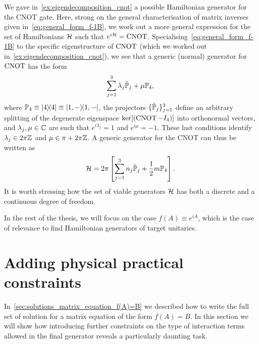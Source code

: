 \begin{example}[label={ex:cnot_generator_decomposition}]
We gave in~\cref{ex:eigendecomposition_cnot} a possible Hamiltonian generator for the CNOT gate.
Here, strong on the general characterisation of matrix inverses given in~\cref{eq:general_form_f-1B}, we work out a more general expression for the set of Hamiltonians ${\mathcal{H}}$ such that $e^{i{\mathcal{H}}}=\operatorname{CNOT}$.
Specialising~\cref{eq:general_form_f-1B} to the specific eigenstructure of $\operatorname{CNOT}$ (which we worked out in~\cref{ex:eigendecomposition_cnot}), we see that a generic (normal) generator for $\operatorname{CNOT}$ has the form
\begin{equation}
    \sum_{j=1}^3 \lambda_j \tilde{\mathbb{P}}_j + \mu\mathbb{P}_4,
\end{equation}
where
$\mathbb{P}_4\equiv\ketbra 4\equiv\ketbra{1,-}$, the projectors 
$\{\tilde{\mathbb{P}}_j\}_{j=1}^3$ define an arbitrary splitting of the degenerate eigenspace $\ker[(\operatorname{CNOT}-I_4)]$ into orthonormal vectors, and $\lambda_j,\mu\in\mathbb{C}$ are such that $e^{i\lambda_j}=1$ and $e^{i\mu}=-1$.
These last conditions identify $\lambda_j\in2\pi\mathbb{Z}$ and $\mu\in\pi + 2\pi\mathbb{Z}$.
A generic generator for the CNOT can thus be written as
\begin{equation}
    {\mathcal{H}} =
    2\pi\left[
    \sum_{j=1}^3 n_j \tilde{\mathbb{P}}_j +
    \frac{1}{2} m\mathbb{P}_4
    \right].
\end{equation}
It is worth stressing how the set of viable generators ${\mathcal{H}}$ has both a discrete and a continuous degree of freedom.
\end{example}

In the rest of the thesis, we will focus on the case $f(A)\equiv e^{iA}$, which is the case of relevance to find Hamiltonian generators of target unitaries.

\section{Adding physical practical constraints}
\label{sec:constraints_on_interaction_pars}

In~\cref{sec:solutions_matrix_equation_f(A)=B} we described how to write the full set of solution for a matrix equation of the form $f(A)=B$.
In this section we will show how introducing further constraints on the type of interaction terms allowed in the final generator reveals a particularly daunting task.


